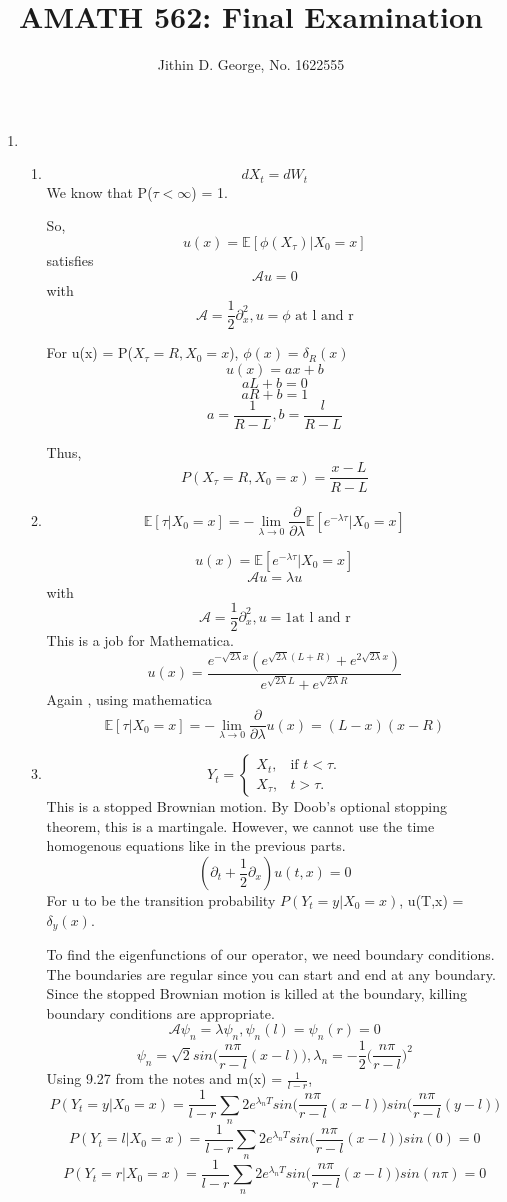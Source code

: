 \documentclass[a4paper,11pt]{article}
\title{AMATH 562: Final Examination}
\author{Jithin D. George, No. 1622555}
\begin{document}
\maketitle
\begin{enumerate}
\item
\begin{enumerate}
\item
\[d X_t = d W_t\]
We know that P($\tau < \infty$) = 1.

So, 
\[u(x)= \mathbb{E}[\phi(X_\tau)|X_0 =x]\]
satisfies 
\[\mathcal{A}u=0\]
with 
\[\mathcal{A} = \frac{1}{2}\partial_x^2, u = \phi \text{ at l and r} \]

For u(x) = P($X_\tau =R,X_0 = x $), $\phi(x) = \delta_R(x)$
\[ u(x)= ax+b\]
\[aL +b =0\]
\[aR +b =1\]
\[a = \frac{1}{R-L} , b = \frac{l}{R-L}\]

Thus, 
\[\boxed{P(X_\tau =R,X_0 = x ) = \frac{x-L}{R-L}}\]
\item 
\[\mathbb{E}[\tau |X_0=x]= - \lim_{\lambda \to 0}\frac{\partial}{\partial \lambda}\mathbb{E}[e^{-\lambda \tau } |X_0=x]\]

\[u(x) = \mathbb{E}[e^{-\lambda \tau } |X_0=x]\]
\[\mathcal{A}u=\lambda u\]
with 
\[\mathcal{A} = \frac{1}{2}\partial_x^2, u = 1 \text{at l and r}\]
This is a job for Mathematica.
\[u(x) = \frac{e^{-\sqrt{2\lambda} x} (e^{\sqrt{2\lambda} (L + R)} + e^{2 \sqrt{2\lambda} x})}{e^{\sqrt{2\lambda} L} + e^{\sqrt{2\lambda} R}}\]
Again , using mathematica
\[\boxed{ \mathbb{E}[\tau |X_0=x]= - \lim_{\lambda \to 0}\frac{\partial}{\partial \lambda}u(x) = (L-x)(x-R) }\]

\item 
\[  Y_t=\begin{cases}
    X_t, & \text{if $t<\tau$}.\\
    X_\tau, & \text{$t>\tau$}.
  \end{cases}\]
  This is a stopped Brownian motion. By Doob's optional stopping theorem, this is a martingale. However, we cannot use the time homogenous equations like in the previous parts.
  \[(\partial_t + \frac{1}{2}\partial_x)u(t,x) =0\]
  For u to be the transition probability $P(Y_t=y|X_0=x)$, u(T,x) = $\delta_y(x)$.
  
To find the eigenfunctions of our operator, we need boundary conditions. The boundaries are regular since you can start and end at any boundary. Since the stopped Brownian motion is killed at the boundary, killing boundary conditions are appropriate.
\[\mathcal{A} \psi_n = \lambda \psi_n, \psi_n(l)= \psi_n(r) =0\]
\[\psi_n = \sqrt{2}sin\bigg(\frac{n\pi}{r-l}(x-l)\bigg), \lambda_n = - \frac{1}{2}\bigg(\frac{n\pi}{r-l}\bigg)^2\]
Using 9.27 from the notes and m(x) = $\frac{1}{l-r}$,
\[P(Y_t=y|X_0=x)= \frac{1}{l-r} \sum_n 2 e^{\lambda_nT}sin\bigg(\frac{n\pi}{r-l}(x-l)\bigg)sin\bigg(\frac{n\pi}{r-l}(y-l)\bigg)\]
\[P(Y_t=l|X_0=x)= \frac{1}{l-r} \sum_n 2 e^{\lambda_nT}sin\bigg(\frac{n\pi}{r-l}(x-l)\bigg)sin(0) =0\]
\[P(Y_t=r|X_0=x)= \frac{1}{l-r} \sum_n 2 e^{\lambda_nT}sin\bigg(\frac{n\pi}{r-l}(x-l)\bigg)sin(n\pi) =0\]


\end{enumerate}
\end{enumerate}
\end{document}
